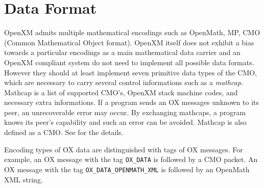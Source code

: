 
\section{Data Format}   

OpenXM admits multiple mathematical encodings such as OpenMath, MP, CMO
(Common Mathematical Object format).
OpenXM itself does not exhibit a bias towards a particular encodings 
as a main mathematical data carrier and an OpenXM compliant system do not need to
implement all possible data formats.
However  they should at least implement seven primitive 
data types of the CMO, which are necessary to 
carry several control informations such as a {\it mathcap}.
Mathcap is a list of supported CMO's, OpenXM stack machine codes, 
and necessary extra informations.
If a program sends an OX messages unknown to its peer, 
an unrecoverable error may occur. 
By exchanging mathcaps, a program knows its peer's capability 
and such an error can be avoided.
Mathcap is also defined as a CMO.
See \cite{ox-rfc-100} for the details.

Encoding types of OX data are distinguished with tags
of OX messages.
For example,
an OX message with the tag 
{\tt OX\_DATA} is followed by a CMO packet.
An OX message with the tag 
{\tt OX\_DATA\_OPENMATH\_XML} is followed by 
an OpenMath XML string.


